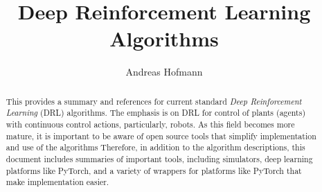 \documentclass[acmlarge,screen]{acmart}
\begin{document}
%
\title{Deep Reinforcement Learning Algorithms}

%
\author{Andreas Hofmann}

%
\renewcommand{\shortauthors}{Hofmann}

%
\begin{abstract}
  This provides a summary and references for current standard \textit{Deep Reinforcement Learning} (DRL) algorithms.
  The emphasis is on DRL for control of plants (agents) with continuous control actions, particularly, robots.
  As this field becomes more mature, it is important to be aware of open source tools that simplify implementation and use of
  the algorithms
  Therefore, in addition to the algorithm descriptions, this document includes summaries of important tools,
  including simulators, deep learning platforms like PyTorch, and a variety of wrappers for platforms like PyTorch that make
  implementation easier.
\end{abstract}


%

%
\maketitle
\end{document}
